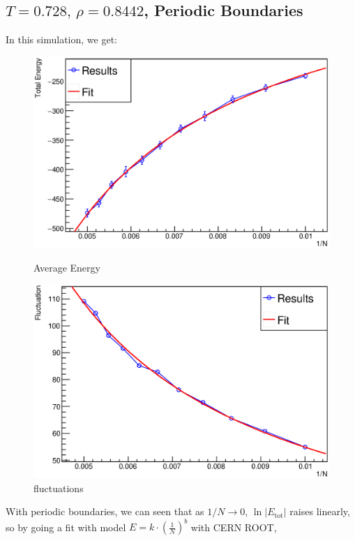 \documentclass[UTF8,a4paper]{article}
\begin{document}
\subsection{$T =0.728,\, \rho = 0.8442$, Periodic Boundaries}
In this simulation, we get:
\begin{figure}[H]
	\centering
	\begin{minipage}[t]{0.45\textwidth}
		\centering
		\includegraphics[height=0.2\textheight]{Root Fit/fit_exp1_p.eps}
		\caption{Average Energy}
	\end{minipage}\hspace{0.5cm}
	\begin{minipage}[t]{0.45\textwidth}
		\centering
		\includegraphics[height=0.2\textheight]{Root Fit/fit_exp1_flu.eps}
		\caption{fluctuations}
	\end{minipage}
\end{figure}
With periodic boundaries, we can seen that as $1/N\to 0$, $\ln \left| E_\text{tot} \right|$ raises linearly, so by going a fit with model $E = k\cdot \left(\frac{1}{N}\right)^{b}$ with CERN ROOT, 
\end{document}
